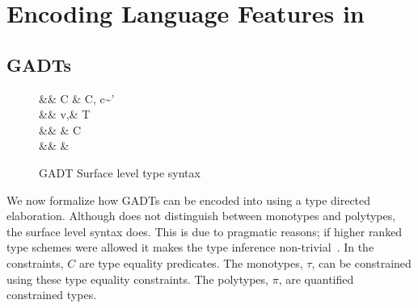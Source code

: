 \documentclass[screen,nonacm,manuscript,review]{acmart} %
\begin{document}

\section{Encoding Language Features in \SFC}\label{sec:sfc-encoding-features}%
\subsection{GADTs}\label{sec:fc-encodes-gadts}
\begin{figure}[ht]
\centering
\begin{syntax}
 && C \bnfeq& \empt \bnfor C, c\co\tau\sim\tau'\\
 && v,\tau \bnfeq& \TyVar \bnfor \tau\to\tau \bnfor T\App\many\tau\\
 && \eta \bnfeq& \tau \bnfor C \then \eta\\
 && \pi \bnfeq& \eta \bnfor \Forall\TyVar\pi
\end{syntax}
\caption{GADT Surface level type syntax}
\label{fig:gadt-type-syntax}
\end{figure}

We now formalize how GADTs can be encoded into \SFC
using a type directed elaboration. Although \SFC does not distinguish
between monotypes and polytypes, the surface level syntax does. This
is due to pragmatic reasons; if higher ranked type schemes were allowed
it makes the type inference non-trivial~\cite{jones_practical_2007}.
In the  constraints, $C$ are type equality
predicates. The monotypes, $\tau$, can be constrained using these type
equality constraints. The polytypes, $\pi$, are quantified constrained types.
\end{document}
